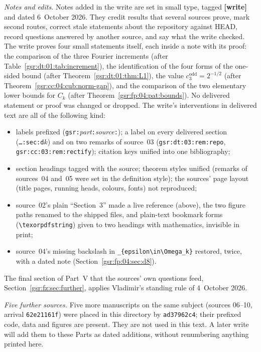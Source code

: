 \documentclass[11pt,letterpaper]{article}
\numberwithin{equation}{section}
\theoremstyle{definition}
\theoremstyle{remark}
\newcommand{\1}{\mathbf 1}
\begin{document}
\emph{Notes and edits.} Notes added in the write are set in small type, tagged \textbf{[write]} and dated 6~October 2026. They credit results that several sources prove, mark second routes, correct stale statements about the repository against HEAD, record questions answered by another source, and say what the write checked. The write proves four small statements itself, each inside a note with its proof: the comparison of the three Fourier increments (after Table~\ref{gsr:dt:01:tab:increment}), the identification of the four forms of the one-sided bound (after Theorem~\ref{gsr:dt:01:thm:L1}), the value $c_3^{\mathrm{odd}}=2^{-1/2}$ (after Theorem~\ref{gsr:cc:04:cub:norm-gap}), and the comparison of the two elementary lower bounds for $C_k$ (after Theorem~\ref{gsr:fp:04:pat:bounds}). No delivered statement or proof was changed or dropped. The write's interventions in delivered text are all of the following kind:
\begin{itemize}[nosep]
\item labels prefixed (\texttt{gsr:}\emph{part}\texttt{:}\emph{source}\texttt{:}); a label on every delivered section (\texttt{\ldots:sec:d}$k$) and on two remarks of source~03 (\texttt{gsr:dt:03:rem:repo}, \texttt{gsr:cc:03:rem:rectify}); citation keys unified into one bibliography;
\item section headings tagged with the source; theorem styles unified (remarks of sources~04 and~05 were set in the definition style); the sources' page layout (title pages, running heads, colours, fonts) not reproduced;
\item source~02's plain ``Section~3'' made a live reference (above), the two figure paths renamed to the shipped files, and plain-text bookmark forms (\texttt{\textbackslash texorpdfstring}) given to two headings with mathematics, invisible in print;
\item source~04's missing backslash in \texttt{\_\{epsilon\textbackslash in\textbackslash Omega\_k\}} restored, twice, with a dated note (Section~\ref{gsr:fp:04:sec:d8}).
\end{itemize}
The final section of Part~V that the sources' own questions feed, Section~\ref{gsr:fz:sec:further}, applies Vladimir's standing rule of 4~October 2026.

\emph{Five further sources.} Five more manuscripts on the same subject (sources 06--10, arrival \texttt{62e21161f}) were placed in this directory by \texttt{ad37962c4}; their prefixed code, data and figures are present. They are not used in this text. A later write will add them to these Parts as dated additions, without renumbering anything printed here.
\end{document}
